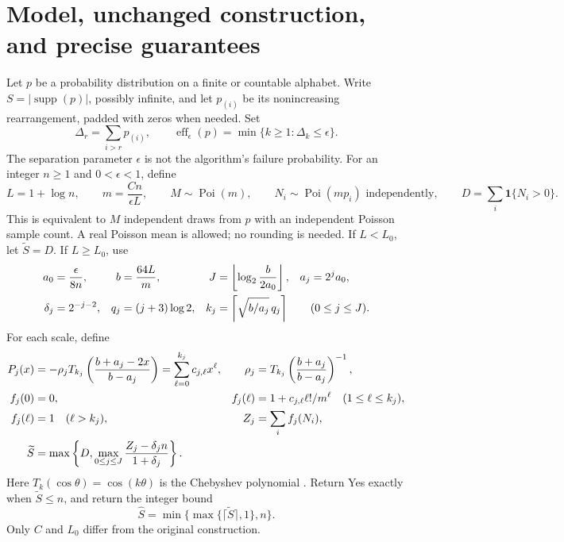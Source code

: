 \documentclass[10pt]{article}
\newcommand{\Poi}{\operatorname{Poi}}
\newcommand{\eff}{\operatorname{eff}}
\newcommand{\ind}{\mathbf 1}
\begin{document}
\section{Model, unchanged construction, and precise guarantees}
Let $p$ be a probability distribution on a finite or countable alphabet.
Write $S=|\operatorname{supp}(p)|$, possibly infinite, and let $p_{(i)}$ be
its nonincreasing rearrangement, padded with zeros when needed. Set
\[
 \Delta_r=\sum_{i>r}p_{(i)},\qquad
 \eff_\epsilon(p)=\min\{k\ge1:\Delta_k\le\epsilon\}.
\]
The separation parameter $\epsilon$ is not the algorithm's failure probability.
For an integer $n\ge1$ and $0<\epsilon<1$, define
\begin{equation}\label{eq:model}
 L=1+\log n,\qquad m=\frac{Cn}{\epsilon L},\qquad
 M\sim\Poi(m),\qquad N_i\sim\Poi(mp_i)\text{ independently},\qquad
 D=\sum_i\ind\{N_i>0\}.
\end{equation}
This is equivalent to $M$ independent draws from $p$ with an independent
Poisson sample count. A real Poisson mean is allowed; no rounding is needed.
If $L<L_0$, let $\widetilde S=D$. If $L\ge L_0$, use
\begin{align}
 a_0&=\frac{\epsilon}{8n},& b&=\frac{64L}{m},&
 J&=\left\lfloor\log_2\frac{b}{2a_0}\right\rfloor,
 &a_j&=2^ja_0,\label{eq:parameters}\\
 \delta_j&=2^{-j-2},&q_j&=(j+3)\log2,&
 k_j&=\left\lceil\sqrt{b/a_j}\,q_j\right\rceil
 &&(0\le j\le J).\notag
\end{align}
For each scale, define
\begin{align}
 P_j(x)&=-\rho_j T_{k_j}\left(\frac{b+a_j-2x}{b-a_j}\right)
       =\sum_{\ell=0}^{k_j}c_{j,\ell}x^\ell,
 &\rho_j&=T_{k_j}\left(\frac{b+a_j}{b-a_j}\right)^{-1},\label{eq:weights}\\
 f_j(0)&=0,&f_j(\ell)&=1+c_{j,\ell}\ell!/m^\ell\quad(1\le\ell\le k_j),\notag\\
 f_j(\ell)&=1\quad(\ell>k_j),&Z_j&=\sum_i f_j(N_i),\notag\\
 \widetilde S&=\max\left\{D,\max_{0\le j\le J}
                    \frac{Z_j-\delta_j n}{1+\delta_j}\right\}.
 \label{eq:statistic}
\end{align}
Here $T_k(\cos\theta)=\cos(k\theta)$ is the Chebyshev polynomial
\cite[18.5.1]{dlmf}.
Return Yes exactly when $\widetilde S\le n$, and return the integer bound
\begin{equation}\label{eq:output}
 \widehat S=\min\{\max\{\lceil\widetilde S\rceil,1\},n\}.
\end{equation}
Only $C$ and $L_0$ differ from the original construction.
\end{document}
